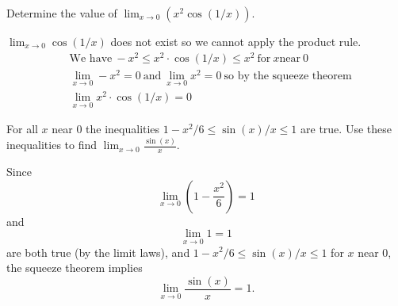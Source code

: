 \documentclass[nooutcomes]{ximera}
\begin{document}
\begin{problem}


  Determine the value of $\lim_{x \to 0} (x^2 \cos(1/x))$.
  \begin{freeResponse}
	$\lim_{x \to 0} \cos(1/x)$ does not exist so we cannot apply the product rule.
	\begin{align*}    
		&\text{We have}\ -x^2 \le x^2 \cdot \cos(1/x) \le x^2\ \text{for}\ x \text{near}\ 0\\
		 &\lim_{x \to 0} -x^2 = 0\ \text{and}\ \lim_{x \to 0} x^2 = 0\ \text{so by the squeeze theorem}\\
    		&\lim_{x \to 0} x^2 \cdot \cos(1/x) = 0
	\end{align*}
  \end{freeResponse}

\end{problem}
	
	
	
	
	
	
\begin{problem}
 For all $x$ near 0 the inequalities $1 - x^2/6 \le \sin(x)/x \le 1$ are true.
  Use these inequalities to find $\displaystyle\lim_{x \to 0} \frac{\sin(x)}{x}$.
  \begin{freeResponse}
    Since
    \[
      \lim_{x \to 0} \left(1 - \frac{x^2}{6}\right) = 1
    \]
    and
    \[
     \lim_{x \to 0} 1 = 1
    \]
    are both true (by the limit laws), and $1 - x^2/6 \le \sin(x)/x \le 1$ for $x$ near 0, the squeeze theorem implies
    \[
     \lim_{x \to 0} \frac{\sin(x)}{x} = 1.
    \]


  \end{freeResponse}



\end{problem}
	
\end{document}

